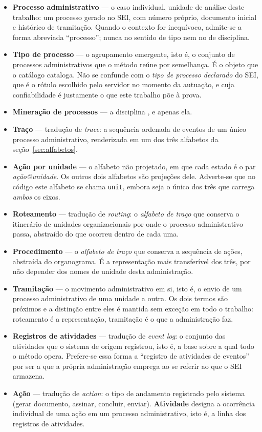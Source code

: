 \begin{itemize}
  \item \textbf{Processo administrativo} --- o caso individual, unidade de análise deste trabalho:
    um processo gerado no SEI, com número próprio, documento inicial e histórico de tramitação. Quando o
    contexto for inequívoco, admite-se a forma abreviada ``processo''; nunca no sentido de tipo nem
    no de disciplina.
  \item \textbf{Tipo de processo} --- o agrupamento emergente, isto é, o conjunto de processos
    administrativos que o método reúne por semelhança. É o objeto que o catálogo cataloga. Não se
    confunde com o \emph{tipo de processo declarado} do SEI, que é o rótulo escolhido pelo servidor
    no momento da autuação, e cuja confiabilidade é justamente o que este trabalho põe à prova.
  \item \textbf{Mineração de processos} --- a disciplina \cite{vanderaalst2016processmining,
    ieee2012manifesto}, e apenas ela.
  \item \textbf{Traço} --- tradução de \emph{trace}: a sequência ordenada de eventos de um único
    processo administrativo, renderizada em um dos três alfabetos da seção~\ref{sec:alfabetos}.
  \item \textbf{Ação por unidade} --- o alfabeto não projetado, em que cada estado é o par
    \emph{ação@unidade}. Os outros dois alfabetos são projeções dele. Adverte-se que no código este
    alfabeto se chama \texttt{unit}, embora seja o único dos três que carrega \emph{ambos} os eixos.
  \item \textbf{Roteamento} --- tradução de \emph{routing}: o \emph{alfabeto de traço} que conserva
    o itinerário de unidades organizacionais por onde o processo administrativo passa, abstraído do
    que ocorreu dentro de cada uma.
  \item \textbf{Procedimento} --- o \emph{alfabeto de traço} que conserva a sequência de ações,
    abstraída do organograma. É a representação mais transferível dos três, por não depender dos
    nomes de unidade desta administração.
  \item \textbf{Tramitação} --- o movimento administrativo em si, isto é, o envio de um processo
    administrativo de uma unidade a outra. Os dois termos são próximos e a distinção entre eles é
    mantida sem exceção em todo o trabalho: roteamento é a representação, tramitação é o que a
    administração faz.
  \item \textbf{Registros de atividades} --- tradução de \emph{event log}: o conjunto das
    atividades que o sistema de origem registrou, isto é, a base sobre a qual todo o método
    opera. Prefere-se essa forma a ``registro de atividades de eventos'' por ser a que a própria administração
    emprega ao se referir ao que o SEI armazena.
  \item \textbf{Ação} --- tradução de \emph{action}: o tipo de andamento registrado pelo sistema
    (gerar documento, assinar, concluir, enviar). \textbf{Atividade} designa a ocorrência
    individual de uma ação em um processo administrativo, isto é, a linha dos registros de atividades.
\end{itemize}

